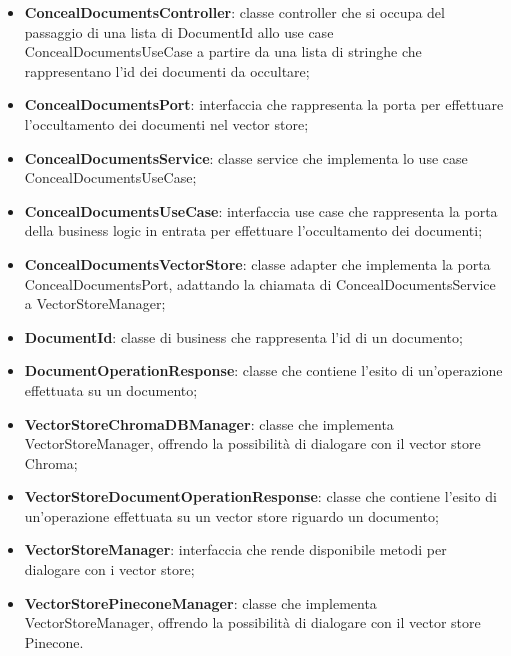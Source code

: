 \documentclass[10pt, a4paper]{article}
\begin{document}
\begin{itemize}
    \item \label{ConcealDocumentsController}\textbf{ConcealDocumentsController}: classe controller che si occupa del passaggio di una lista di DocumentId allo use case ConcealDocumentsUseCase a partire da una lista di stringhe che rappresentano l'id dei documenti da occultare;
    \item \label{ConcealDocumentsPort}\textbf{ConcealDocumentsPort}: interfaccia che rappresenta la porta per effettuare l'occultamento dei documenti nel vector store;
    \item \label{ConcealDocumentsService}\textbf{ConcealDocumentsService}: classe service che implementa lo use case ConcealDocumentsUseCase;
    \item \label{ConcealDocumentsUseCase}\textbf{ConcealDocumentsUseCase}: interfaccia use case che rappresenta la porta della business logic in entrata per effettuare l'occultamento dei documenti;
    \item \label{ConcealDocumentsVectorStore}\textbf{ConcealDocumentsVectorStore}: classe adapter che implementa la porta ConcealDocumentsPort, adattando la chiamata di ConcealDocumentsService a VectorStoreManager;
    \item \label{DocumentId}\textbf{DocumentId}: classe di business che rappresenta l'id di un documento;
    \item \label{DocumentOperationResponse}\textbf{DocumentOperationResponse}: classe che contiene l'esito di un'operazione effettuata su un documento;
    \item \label{VectorStoreChromaDBManager}\textbf{VectorStoreChromaDBManager}: classe che implementa VectorStoreManager, offrendo la possibilità di dialogare con il vector store Chroma;
    \item \label{VectorStoreDocumentOperationResponse} \textbf{VectorStoreDocumentOperationResponse}: classe che contiene l'esito di un'operazione effettuata su un vector store riguardo un documento;
    \item \label{VectorStoreManager}\textbf{VectorStoreManager}: interfaccia che rende disponibile metodi per dialogare con i vector store;
    \item \label{VectorStorePineconeManager}\textbf{VectorStorePineconeManager}: classe che implementa VectorStoreManager, offrendo la possibilità di dialogare con il vector store Pinecone.
\end{itemize}
\end{document}
